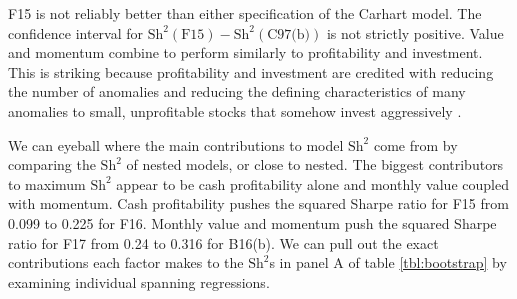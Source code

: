 F15 is not reliably better than either specification of the Carhart model. The confidence
interval for $\text{Sh}^2(\text{F15})-\text{Sh}^2(\text{C97(b)})$ is not strictly
positive. Value and momentum combine to perform similarly to profitability and investment.
This is striking because profitability and investment are credited with reducing the
number of anomalies and reducing the defining characteristics of many anomalies to small,
unprofitable stocks that somehow invest aggressively \parencite{fama2015five,
fama2016dissecting}.

We can eyeball where the main contributions to model $\text{Sh}^2$ come from by comparing
the $\text{Sh}^2$ of nested models, or close to nested. The biggest contributors to
maximum $\text{Sh}^2$ appear to be cash profitability alone and monthly value coupled with
momentum. Cash profitability pushes the squared Sharpe ratio for F15 from 0.099 to 0.225
for F16. Monthly value and momentum push the squared Sharpe ratio for F17 from 0.24 to
0.316 for B16(b). We can pull out the exact contributions each factor makes to the
$\text{Sh}^2$s in panel A of table \ref{tbl:bootstrap} by examining individual spanning
regressions.

